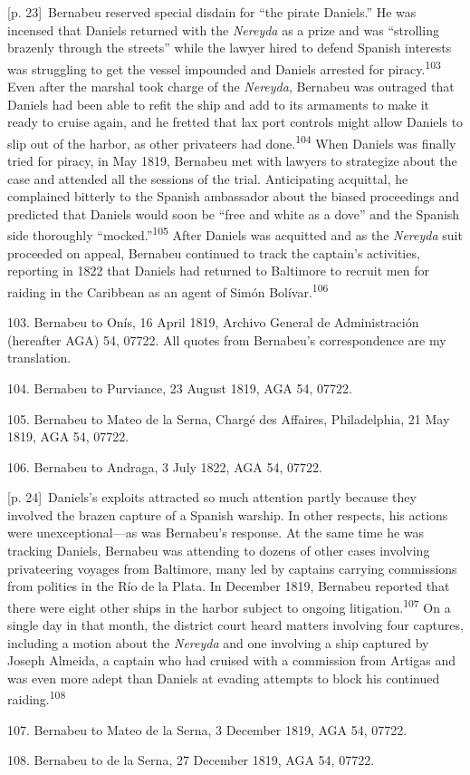 \documentclass[10pt,a4paper]{article}
\begin{document}
{\scriptsize\color{gray} [p. 23]}\ Bernabeu reserved special disdain for “the pirate Daniels.” He was incensed that Daniels returned with the \textit{Nereyda} as a prize and was “strolling brazenly through the streets” while the lawyer hired to defend Spanish interests was struggling to get the vessel impounded and Daniels arrested for piracy.\nobreak\textsuperscript{103} Even after the marshal took charge of the \textit{Nereyda}, Bernabeu was outraged that Daniels had been able to refit the ship and add to its armaments to make it ready to cruise again, and he fretted that lax port controls might allow Daniels to slip out of the harbor, as other privateers had done.\nobreak\textsuperscript{104} When Daniels was finally tried for piracy, in May 1819, Bernabeu met with lawyers to strategize about the case and attended all the sessions of the trial. Anticipating acquittal, he complained bitterly to the Spanish ambassador about the biased proceedings and predicted that Daniels would soon be “free and white as a dove” and the Spanish side thoroughly “mocked.”\nobreak\textsuperscript{105} After Daniels was acquitted and as the \textit{Nereyda} suit proceeded on appeal, Bernabeu continued to track the captain’s activities, reporting in 1822 that Daniels had returned to Baltimore to recruit men for raiding in the Caribbean as an agent of Simón Bolívar.\nobreak\textsuperscript{106}\par{\small 103. Bernabeu to Onís, 16 April 1819, Archivo General de Administración (hereafter AGA) 54, 07722. All quotes from Bernabeu’s correspondence are my translation.\par}{\small 104. Bernabeu to Purviance, 23 August 1819, AGA 54, 07722.\par}{\small 105. Bernabeu to Mateo de la Serna, Chargé des Affaires, Philadelphia, 21 May 1819, AGA 54, 07722.\par}{\small 106. Bernabeu to Andraga, 3 July 1822, AGA 54, 07722.\par}
{\scriptsize\color{gray} [p. 24]}\ Daniels’s exploits attracted so much attention partly because they involved the brazen capture of a Spanish warship. In other respects, his actions were unexceptional—as was Bernabeu’s response. At the same time he was tracking Daniels, Bernabeu was attending to dozens of other cases involving privateering voyages from Baltimore, many led by captains carrying commissions from polities in the Río de la Plata. In December 1819, Bernabeu reported that there were eight other ships in the harbor subject to ongoing litigation.\nobreak\textsuperscript{107} On a single day in that month, the district court heard matters involving four captures, including a motion about the \textit{Nereyda} and one involving a ship captured by Joseph Almeida, a captain who had cruised with a commission from Artigas and was even more adept than Daniels at evading attempts to block his continued raiding.\nobreak\textsuperscript{108}\par{\small 107. Bernabeu to Mateo de la Serna, 3 December 1819, AGA 54, 07722.\par}{\small 108. Bernabeu to de la Serna, 27 December 1819, AGA 54, 07722.\par}
\end{document}
